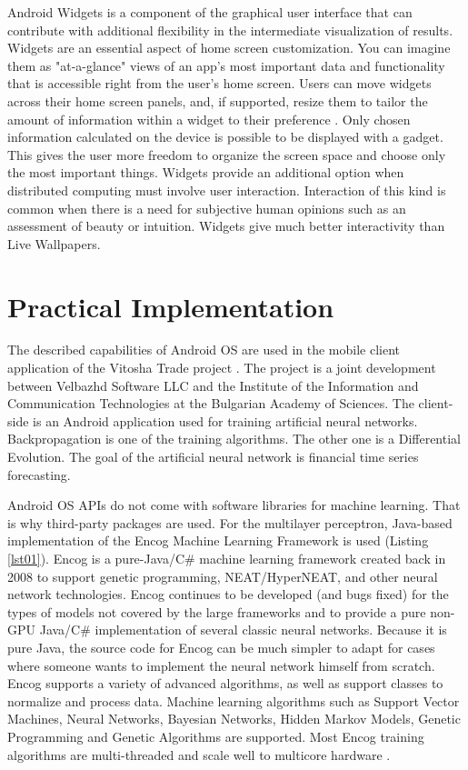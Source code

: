 \documentclass[a4paper,conference]{IEEEtran}
\begin{document}
Android Widgets is a component of the graphical user interface that can contribute with additional flexibility in the intermediate visualization of results. Widgets are an essential aspect of home screen customization. You can imagine them as "at-a-glance" views of an app's most important data and functionality that is accessible right from the user's home screen. Users can move widgets across their home screen panels, and, if supported, resize them to tailor the amount of information within a widget to their preference \cite{Google-02}. Only chosen information calculated on the device is possible to be displayed with a gadget. This gives the user more freedom to organize the screen space and choose only the most important things. Widgets provide an additional option when distributed computing must involve user interaction. Interaction of this kind is common when there is a need for subjective human opinions such as an assessment of beauty or intuition. Widgets give much better interactivity than Live Wallpapers. 

\section{Practical Implementation}

The described capabilities of Android OS are used in the mobile client application of the Vitosha Trade project \cite{Balabanov-01}. The project is a joint development between Velbazhd Software LLC and the Institute of the Information and Communication Technologies at the Bulgarian Academy of Sciences. The client-side is an Android application used for training artificial neural networks. Backpropagation is one of the training algorithms. The other one is a Differential Evolution. The goal of the artificial neural network is financial time series forecasting. 

Android OS APIs do not come with software libraries for machine learning. That is why third-party packages are used. For the multilayer perceptron, Java-based implementation of the Encog Machine Learning Framework is used (Listing \ref{lst01}). Encog is a pure-Java/C\# machine learning framework created back in 2008 to support genetic programming, NEAT/HyperNEAT, and other neural network technologies. Encog continues to be developed (and bugs fixed) for the types of models not covered by the large frameworks and to provide a pure non-GPU Java/C\# implementation of several classic neural networks. Because it is pure Java, the source code for Encog can be much simpler to adapt for cases where someone wants to implement the neural network himself from scratch. Encog supports a variety of advanced algorithms, as well as support classes to normalize and process data. Machine learning algorithms such as Support Vector Machines, Neural Networks, Bayesian Networks, Hidden Markov Models, Genetic Programming and Genetic Algorithms are supported. Most Encog training algorithms are multi-threaded and scale well to multicore hardware \cite{Heaton-01}.
\end{document}
